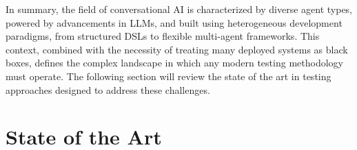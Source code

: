 In summary,
the field of conversational \ac{AI} is characterized by diverse agent types,
powered by advancements in \acp{LLM},
and built using heterogeneous development paradigms,
from structured \acp{DSL} to flexible multi-agent frameworks.
This context, combined with the necessity of treating many deployed systems as black boxes,
defines the complex landscape in which any modern testing methodology must operate.
The following section will review the state of the art in testing approaches designed to address these challenges.
%
%
%

\section{State of the Art}

